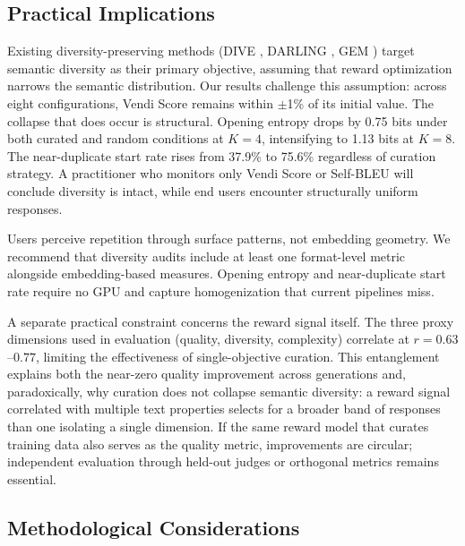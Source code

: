 
\subsection{Practical Implications}

Existing diversity-preserving methods (DIVE \cite{placeholder_dive}, DARLING \cite{placeholder_darling}, GEM \cite{placeholder_gem}) target semantic diversity as their primary objective, assuming that reward optimization narrows the semantic distribution. Our results challenge this assumption: across eight configurations, Vendi Score remains within $\pm$1\% of its initial value. The collapse that does occur is structural. Opening entropy drops by 0.75 bits under both curated and random conditions at $K{=}4$, intensifying to 1.13 bits at $K{=}8$. The near-duplicate start rate rises from 37.9\% to 75.6\% regardless of curation strategy. A practitioner who monitors only Vendi Score or Self-BLEU will conclude diversity is intact, while end users encounter structurally uniform responses.

Users perceive repetition through surface patterns, not embedding geometry. We recommend that diversity audits include at least one format-level metric alongside embedding-based measures. Opening entropy and near-duplicate start rate require no GPU and capture homogenization that current pipelines miss.

A separate practical constraint concerns the reward signal itself. The three proxy dimensions used in evaluation (quality, diversity, complexity) correlate at $r = 0.63$--$0.77$, limiting the effectiveness of single-objective curation. This entanglement explains both the near-zero quality improvement across generations and, paradoxically, why curation does not collapse semantic diversity: a reward signal correlated with multiple text properties selects for a broader band of responses than one isolating a single dimension. If the same reward model that curates training data also serves as the quality metric, improvements are circular; independent evaluation through held-out judges or orthogonal metrics remains essential.

\subsection{Methodological Considerations}

